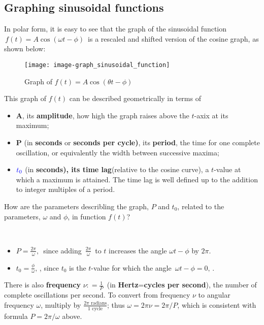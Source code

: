 \subsection{Graphing sinusoidal functions}
In polar form, it is easy to see that the graph of the sinusoidal function
$\, f(t)=A \cos (\omega t-\phi )\,$
is a rescaled and shifted version of the cosine graph, as shown below:

\begin{figure}[ht!]
  \centering
  \texttt{[image: image-graph\_sinusoidal\_function]}
  \caption{Graph of $f(t) = A \cos \left( \theta t - \phi \right)$}
\end{figure}

This graph of $f(t)$ can be described geometrically in terms of
\begin{itemize}
\item \textbf{\color{blue} A}, its \textbf{\color{blue} amplitude}, how high the graph raises above
  the $t$-axix at its maximum;
\item \textbf{\color{blue} P} (in \textbf{\color{orange} seconds} or \textbf{\color{orange}seconds per cycle)},
  its \textbf{\color{blue} period}, the time for one complete oscillation, or equivalently the width between successive maxima;
\item ${\color{blue} t_0}$ (in \textbf{\color{orange} seconds), its \textbf{\color{blue}} time lag}(relative to the cosine curve),
  a $t$-value at which a maximum is attained. The time lag is well defined up to the addition to integer multiples of a period.
\end{itemize}

\begin{question}
  How are the parameters describling the graph, $P$ and $t_0$, related to the parameters,
  $\omega$ and $\phi$, in function $f(t)$?
\end{question}
\Answer \\
\begin{itemize}
\item $\displaystyle P = \frac{2 \pi }{\omega },\,$ since adding $\, \displaystyle \frac{2\pi }{\omega }\,$
  to $t$ increases the angle $\omega t - \phi$ by $2 \pi$.
\item $\displaystyle t_0= \frac{\phi }{\omega },\,$, since $t_0$ is the $t$-value for which the angle
  $\, \omega t - \phi =0,\,$. 
\end{itemize}

There is also \textbf{\color{blue} frequency} $\displaystyle \nu \colon =\frac{1}{P}\,$
(in \textbf{\color{orange}Hertz}=\textbf{\color{orange}cycles per second}), the number of
complete oscillations per second. To convert from frequency $\nu$ to angular frequency
$\omega$, multiply by $\frac{2\pi \textrm{ radians}}{1 \textrm{ cycle}}$; thus
$\omega = 2\pi \nu = 2\pi /P$, which is consistent with formula $P = 2\pi /\omega$
above.\\


